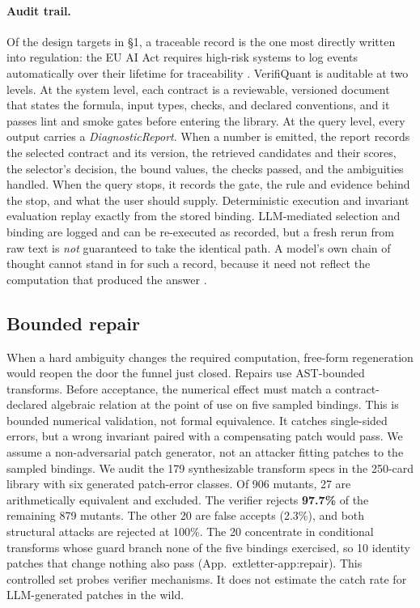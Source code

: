 \documentclass[sigconf]{acmart}
\newif\ifarxiv
\newcommand{\extref}[1]{App.~\ifarxiv\ref{#1}\else\csname extletter-#1\endcsname\fi}
\begin{document}
\paragraph{Audit trail.}
Of the design targets in \S1, a traceable record is the one most directly written into regulation: the EU AI Act requires high-risk systems to log events automatically over their lifetime for traceability \cite[Art.~12]{euaiact2024}. VerifiQuant is auditable at two levels. At the system level, each contract is a reviewable, versioned document that states the formula, input types, checks, and declared conventions, and it passes lint and smoke gates before entering the library. At the query level, every output carries a \emph{DiagnosticReport}. When a number is emitted, the report records the selected contract and its version, the retrieved candidates and their scores, the selector's decision, the bound values, the checks passed, and the ambiguities handled. When the query stops, it records the gate, the rule and evidence behind the stop, and what the user should supply.
Deterministic execution and invariant evaluation replay exactly from the stored binding. LLM-mediated selection and binding are logged and can be re-executed as recorded, but a fresh rerun from raw text is \emph{not} guaranteed to take the identical path. A model's own chain of thought cannot stand in for such a record, because it need not reflect the computation that produced the answer \cite{turpin2023language}.

\subsection{Bounded repair}
When a hard ambiguity changes the required computation, free-form regeneration would reopen the door the funnel just closed.
Repairs use AST-bounded transforms. Before acceptance, the numerical effect must match a contract-declared algebraic relation at the point of use on five sampled bindings. This is bounded numerical validation, not formal equivalence. It catches single-sided errors, but a wrong invariant paired with a compensating patch would pass. We assume a non-adversarial patch generator, not an attacker fitting patches to the sampled bindings.
We audit the 179 synthesizable transform specs in the 250-card library with six generated patch-error classes. Of 906 mutants, 27 are arithmetically equivalent and excluded. The verifier rejects \textbf{97.7\%} of the remaining 879 mutants. The other 20 are false accepts (2.3\%), and both structural attacks are rejected at 100\%. The 20 concentrate in conditional transforms whose guard branch none of the five bindings exercised, so 10 identity patches that change nothing also pass (\extref{app:repair}). This controlled set probes verifier mechanisms. It does not estimate the catch rate for LLM-generated patches in the wild.
\end{document}
